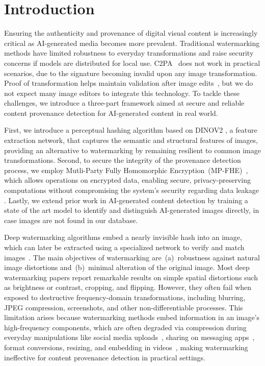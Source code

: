 
\section{Introduction}
\label{sec:intro}

Ensuring the authenticity and provenance of digital visual content is increasingly critical as AI-generated media becomes more prevalent. Traditional watermarking methods have limited robustness to everyday transformations and raise security concerns if models are distributed for local use. C2PA~\cite{c2pa2023} does not work in practical scenarios, due to the signature becoming invalid upon any image transformation. Proof of transformation helps maintain validation after image edits~\cite{vimz, veritas}, but we do not expect many image editors to integrate this technology. To tackle these challenges, we introduce a three-part framework aimed at secure and reliable content provenance detection for AI-generated content in real world.

First, we introduce a perceptual hashing algorithm based on DINOV2 \cite{oquab2023dinov2}, a feature extraction network, that captures the semantic and structural features of images, providing an alternative to watermarking by remaining resilient to common image transformations. Second, to secure the integrity of the provenance detection process, we employ Mutli-Party Fully Homomorphic Encryption~(MP-FHE)~\cite{mouchet2021multiparty}, which allows operations on encrypted data, enabling secure, privacy-preserving computations without compromising the system's security regarding data leakage \cite{gentry2009fully}. Lastly, we extend prior work in AI-generated content detection by training a state of the art model to identify and distinguish AI-generated images directly, in case images are not found in our database.

Deep watermarking algorithms embed a nearly invisible hash into an image, which can later be extracted using a specialized network to verify and match images~\cite{deep_watermark}. The main objectives of watermarking are~(a)~robustness against natural image distortions and~(b)~minimal alteration of the original image. Most deep watermarking papers report remarkable results on simple spatial distortions such as brightness or contrast, cropping, and flipping. However, they often fail when exposed to destructive frequency-domain transformations, including blurring, JPEG compression, screenshots, and other non-differentiable processes. This limitation arises because watermarking methods embed information in an image’s high-frequency components, which are often degraded via compression during everyday manipulations like social media uploads~\cite{laghari2018assessment}, sharing on messaging apps~\cite{anwar2021image}, format conversions, resizing, and embedding in videos~\cite{YoutubeCompression}, making watermarking ineffective for content provenance detection in practical settings. 

